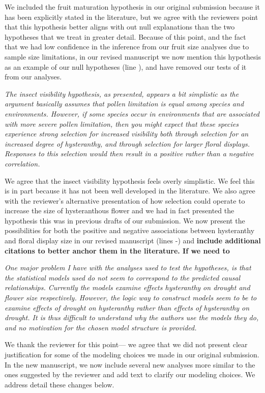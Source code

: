 \documentclass{article}[12pt]
\begin{document}
We included the fruit maturation hypothesis in our original submission because it has been explicitly stated in the literature, but we agree with the reviewers point that this hypothesis better aligns with out null explanations than the two hypotheses that we treat in greater detail. Because of this point, and the fact that we had low confidence in the inference from our fruit size analyses due to sample size limitations, in our revised manuscript we now mention this hypothesis as an example of our null hypotheses (line ), and have removed our tests of it from our analyses.

\emph{The insect visibility hypothesis, as presented, appears a bit simplistic as the argument basically assumes that pollen limitation is equal among species and environments. However, if some species occur in environments that are associated with more severe pollen limitation, then you might expect that these species experience strong selection for increased visibility both through selection for an increased degree of hysteranthy, and through selection for larger floral displays. Responses to this selection would then result in a positive rather than a negative correlation.}

We agree that the insect visibility hypothesis feels overly simplistic. We feel this is in part because it has not been well developed in the literature. We also agree with the reviewer's alternative presentation of how selection could operate to increase the size of hysteranthous flower and we had in fact presented the hypothesis this was in previous drafts of our submission. We now present the possibilities for both the positive and negative associations between hysteranthy and floral display size in our revised manuscript (lines -) and \textbf{include additional citations to better anchor them in the literature. If we need to} 

\emph{One major problem I have with the analyses used to test the hypotheses, is that the statistical models used do not seem to correspond to the predicted causal relationships. Currently the models examine effects hysteranthy on drought and flower size respectively. However, the logic way to construct models seem to be to examine effects of drought on hysteranthy rather than effects of hysteranthy on drought. It is thus difficult to understand why the authors use the models they do, and no motivation for the chosen model structure is provided.}

We thank the reviewer for this point--- we agree that we did not present clear justification for some of the modeling choices we made in our original submission. In the new manuscript, we now include several new analyses more similar to the ones suggested by the reviewer and add text to clarify our modeling choices. We address detail these changes below.
\end{document}
